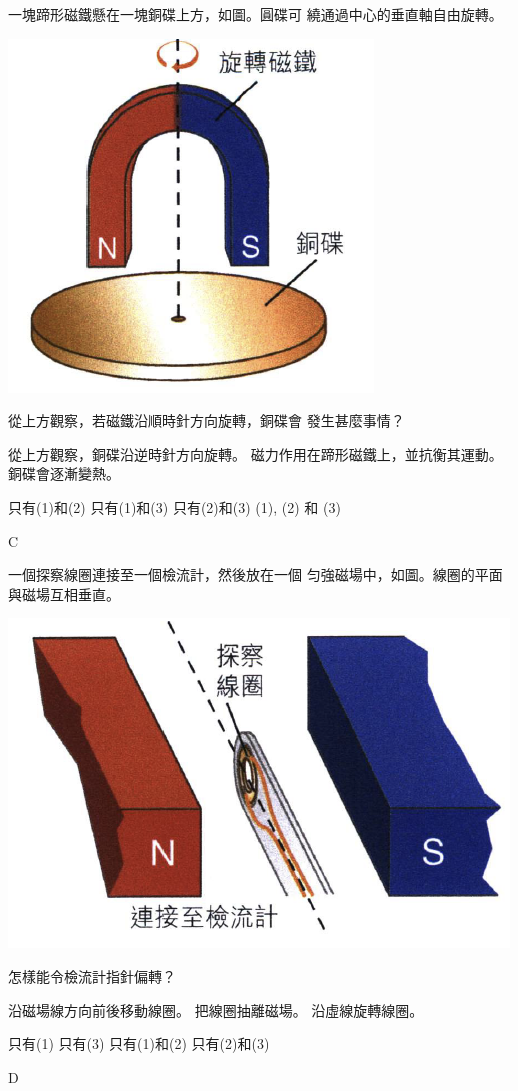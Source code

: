{
    一塊蹄形磁鐵懸在一塊銅碟上方，如圖。圓碟可 繞通過中心的垂直軸自由旋轉。
    \par{\par\centering\includegraphics[width=.25\textwidth]{./img/ch5_induction_mc_2024-06-24-16-54-03.png}\par}
    從上方觀察，若磁鐵沿順時針方向旋轉，銅碟會 發生甚麼事情？
    \begin{statements}
        \task 從上方觀察，銅碟沿逆時針方向旋轉。
        \task 磁力作用在蹄形磁鐵上，並抗衡其運動。
        \task 銅碟會逐漸變熱。
    \end{statements}
    \begin{tasks}
        \task 只有(1)和(2)
        \task 只有(1)和(3)
        \task 只有(2)和(3)
        \task (1), (2) 和 (3)
    \end{tasks}
}{C}

{
    一個探察線圈連接至一個檢流計，然後放在一個 匀強磁場中，如圖。線圈的平面與磁場互相垂直。
    \par{\par\centering\includegraphics[width=.3\textwidth]{./img/ch5_induction_mc_2024-06-24-16-54-54.png}\par}
    怎樣能令檢流計指針偏轉？
    \begin{statements}
        \task 沿磁場線方向前後移動線圈。
        \task 把線圈抽離磁場。
        \task 沿虛線旋轉線圈。
    \end{statements}
    \begin{tasks}
        \task 只有(1)
        \task 只有(3)
        \task 只有(1)和(2)
        \task 只有(2)和(3)
    \end{tasks}
}{D}

